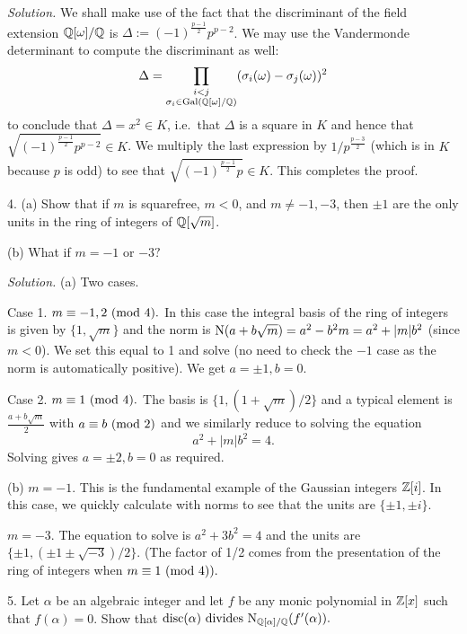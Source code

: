 \documentclass[10pt,a4paper,reqno]{amsart}
\begin{document}
\bigskip

\textit{Solution.} We shall make use of the fact that the discriminant of the
field extension $\mathbb{Q}[\omega]/\mathbb{Q}$ is $\Delta := (-1)^{\frac{p-1}{2}}p^{p-2}$. We
may use the Vandermonde determinant to compute the discriminant as well:
\[\Delta = \prod_{\substack{i< j\\
\sigma_i \in \mathrm{Gal}(\mathbb{Q}[\omega]/\mathbb{Q})}}
(\sigma_i(\omega)-\sigma_j(\omega))^{2}\] to conclude that $\Delta = x^2 \in
K$, i.e.~that $\Delta$ is a square in $K$ and hence that
$\sqrt{(-1)^{\frac{p-1}{2}}p^{p-2}} \in K$. We multiply the last expression by
$1/p^{\frac{p-3}{2}}$ (which is in $K$ because $p$ is odd) to see that
$\sqrt{(-1)^{\frac{p-1}{2}}p} \in K$. This completes the proof.

\bigskip

4. (a) Show that if $m$ is squarefree, $m <0$, and $m\neq -1, -3$, then $\pm 1$
are the only units in the ring of integers of $\mathbb{Q}[\sqrt{m}]$.

(b) What if $m = -1$ or $-3?$

\bigskip

\textit{Solution.} (a) Two cases.

Case 1. $m\equiv -1,2\text{ } (\mathrm{mod}\text{ } 4).$ In this case the integral basis of the ring of
integers is given by $\{1,\sqrt{m}\}$ and the norm is $\mathrm{N}(a+b\sqrt{m}) =
a^2-b^2 m = a^2+|m|b^2$ (since $m< 0$). We set this equal to 1 and solve (no
need to check the $-1$ case as the norm is automatically positive). We get
$a=\pm 1, b = 0$.

Case 2. $m\equiv 1 \text{ } (\mathrm{mod}\text{ } 4).$ The basis is $\{1,(1+\sqrt{m})/2\}$ and a typical
element is $\frac{a+b\sqrt{m}}{2}$ with $a\equiv b \text{ } (\mathrm{mod}\text{ } 2)$ and we similarly
reduce to solving the equation \[a^2+|m|b^2 = 4.\] Solving gives $a = \pm 2,
b=0$ as required.

(b) $m=-1.$ This is the fundamental example of the Gaussian integers $\mathbb{Z}[i]$.
In this case, we quickly calculate with norms to see that the units are $\{\pm
1, \pm i\}.$

$m=-3.$ The equation to solve is $a^2+3b^2 = 4$ and the units are $\{\pm 1,(\pm
1\pm \sqrt{-3})/2\}.$ (The factor of 1/2 comes from the presentation of the
ring of integers when $m\equiv 1 \text{ } (\mathrm{mod}\text{ } 4)).$

\bigskip

5. Let $\alpha$ be an algebraic integer and let $f$ be any monic polynomial in
$\mathbb{Z}[x]$ such that $f(\alpha)=0$. Show that \( \mathrm{disc}(\alpha) \text{ divides }
\mathrm{N}_{\mathbb{Q}[\alpha]/\mathbb{Q}}(f'(\alpha)).\)
\end{document}

